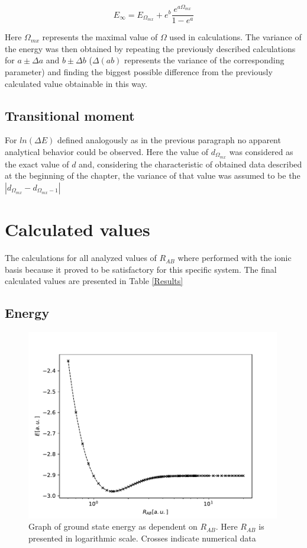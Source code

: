 \documentclass{pracalicmgr}
\begin{document}
\begin{equation}
    E_{\infty} = E_{\Omega_{mx}} + e^b\frac{e^{a\Omega_{mx}}}{1-e^{a}}
\end{equation}

Here $\Omega_{mx}$ represents the maximal value of $\Omega$ used in calculations. 
The variance of the energy was then obtained by repeating the previously described calculations for $a\pm \Delta a$ and $b\pm \Delta b$ ($\Delta \left(ab\right)$ represents the variance of the corresponding parameter) and finding the biggest possible difference from the previously calculated value obtainable in this way.

\subsection{Transitional moment}

For $ln\left(\Delta E\right)$ defined analogously as in the previous paragraph no apparent analytical behavior could be observed. Here the value of $d_{\Omega_{mx}}$ was considered as the exact value of $d$ and, considering the characteristic of obtained data described at the beginning of the chapter, the variance of that value was assumed to be the $\left|d_{\Omega_{mx}}-d_{\Omega_{mx}-1}\right|$

\section{Calculated values}

The calculations for all analyzed values of $R_{AB}$ where performed with the ionic basis because it proved to be satisfactory for this specific system. The final calculated values are presented in Table \ref{Results}

\subsection{Energy}

\begin{figure}[H]
    \center
    \includegraphics[width=0.99\textwidth]{14E.pdf}
    \caption{Graph of ground state energy as dependent on $R_{AB}$. Here $R_{AB}$ is presented in logarithmic scale. Crosses indicate numerical data}
    \label{E full}
\end{figure}
\end{document}
